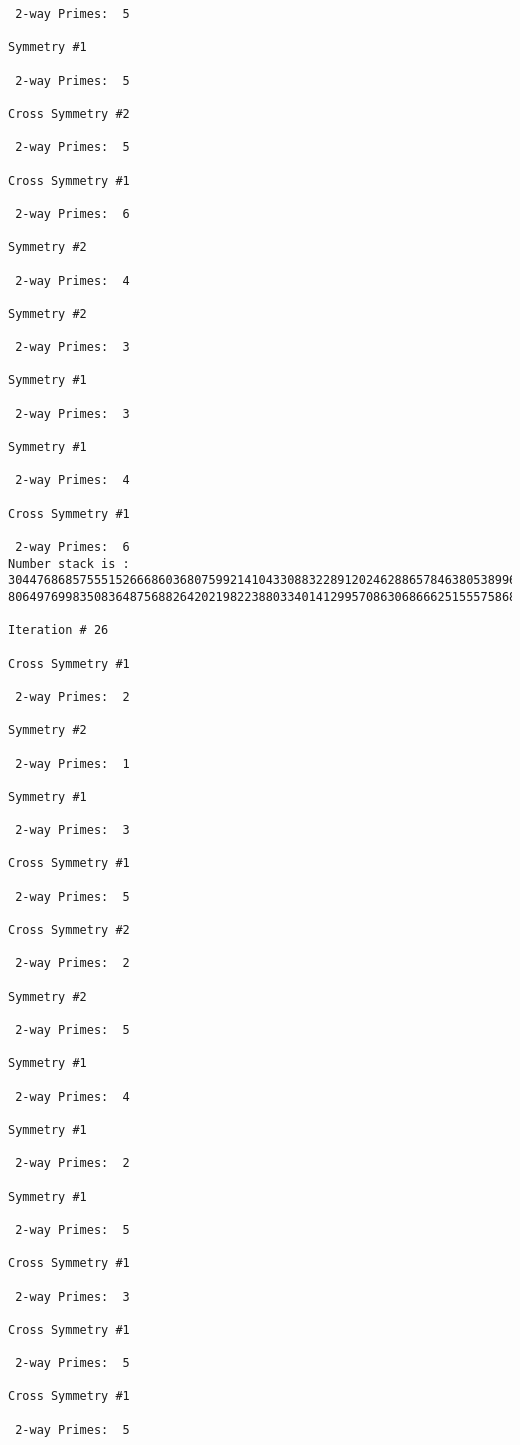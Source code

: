{{{{\begin{verbatim}
 2-way Primes: 	5

Symmetry #1

 2-way Primes: 	5

Cross Symmetry #2

 2-way Primes: 	5

Cross Symmetry #1

 2-way Primes: 	6

Symmetry #2

 2-way Primes: 	4

Symmetry #2

 2-way Primes: 	3

Symmetry #1

 2-way Primes: 	3

Symmetry #1

 2-way Primes: 	4

Cross Symmetry #1

 2-way Primes: 	6
Number stack is :
30447686857555152666860368075992141043308832289120246288657846380538996794608835958544046240163340857
80649769983508364875688264202198223880334014129957086306866625155575868674403758043361042640445859538

Iteration #	26

Cross Symmetry #1

 2-way Primes: 	2

Symmetry #2

 2-way Primes: 	1

Symmetry #1

 2-way Primes: 	3

Cross Symmetry #1

 2-way Primes: 	5

Cross Symmetry #2

 2-way Primes: 	2

Symmetry #2

 2-way Primes: 	5

Symmetry #1

 2-way Primes: 	4

Symmetry #1

 2-way Primes: 	2

Symmetry #1

 2-way Primes: 	5

Cross Symmetry #1

 2-way Primes: 	3

Cross Symmetry #1

 2-way Primes: 	5

Cross Symmetry #1

 2-way Primes: 	5


\end{verbatim}}}}}
